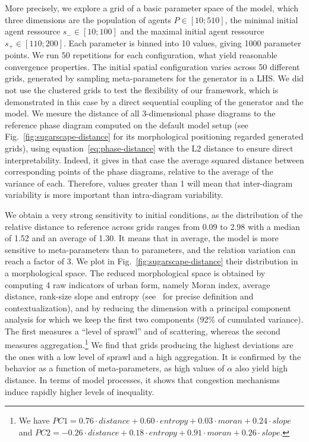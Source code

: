\documentclass[Afour,sageh,times]{sagej}
\begin{document}
More precisely, we explore a grid of a basic parameter space of the model, which three dimensions are the population of agents $P\in \left[10;510\right]$, the minimal initial agent ressource $s_{-}\in \left[10;100\right]$ and the maximal initial agent ressource $s_{+}\in \left[110;200\right]$. Each parameter is binned into 10 values, giving 1000 parameter points. We run 50 repetitions for each configuration, what yield reasonable convergence properties. The initial spatial configuration varies across 50 different grids, generated by sampling meta-parameters for the generator in a LHS. We did not use the clustered grids to test the flexibility of our framework, which is demonstrated in this case by a direct sequential coupling of the generator and the model. We mesure the distance of all 3-dimensional phase diagrams to the reference phase diagram computed on the default model setup (see Fig.~\ref{fig:sugarscape-distance} for its morphological positioning regarded generated grids), using equation~\ref{eq:phase-distance} with the L2 distance to ensure direct interpretability. Indeed, it gives in that case the average squared distance between corresponding points of the phase diagrams, relative to the average of the variance of each. Therefore, values greater than 1 will mean that inter-diagram variability is more important than intra-diagram variability.


We obtain a very strong sensitivity to initial conditions, as the distribution of the relative distance to reference across grids ranges from 0.09 to 2.98 with a median of 1.52 and an average of 1.30. It means that in average, the model is more sensitive to meta-parameters than to parameters, and the relation variation can reach a factor of 3. We plot in Fig.~\ref{fig:sugarscape-distance} their distribution in a morphological space. The reduced morphological space is obtained by computing 4 raw indicators of urban form, namely Moran index, average distance, rank-size slope and entropy (see~\cite{LeNechet2015} for precise definition and contextualization), and by reducing the dimension with a principal component analysis for which we keep the first two components (92\% of cumulated variance). The first measures a ``level of sprawl'' and of scattering, whereas the second measures aggregation.\footnote{We have $PC1 = 0.76\cdot distance + 0.60\cdot entropy + 0.03\cdot moran + 0.24\cdot slope$ and $PC2 = -0.26\cdot distance + 0.18\cdot entropy + 0.91\cdot moran + 0.26\cdot slope$.} We find that grids producing the highest deviations are the ones with a low level of sprawl and a high aggregation. It is confirmed by the behavior as a function of meta-parameters, as high values of $\alpha$ also yield high distance. In terms of model processes, it shows that congestion mechanisms induce rapidly higher levels of inequality.
\end{document}
